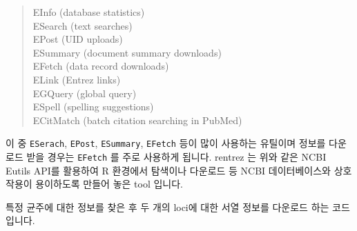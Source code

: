 \documentclass[
]{book}
\newenvironment{Shaded}{\begin{snugshade}}{\end{snugshade}}
\newcommand{\AttributeTok}[1]{\textcolor[rgb]{0.77,0.63,0.00}{#1}}
\newcommand{\FunctionTok}[1]{\textcolor[rgb]{0.00,0.00,0.00}{#1}}
\newcommand{\NormalTok}[1]{#1}
\newcommand{\OtherTok}[1]{\textcolor[rgb]{0.56,0.35,0.01}{#1}}
\newcommand{\SpecialCharTok}[1]{\textcolor[rgb]{0.00,0.00,0.00}{#1}}
\newcommand{\StringTok}[1]{\textcolor[rgb]{0.31,0.60,0.02}{#1}}
\begin{document}
\begin{quote}
EInfo (database statistics)\\
ESearch (text searches)\\
EPost (UID uploads)\\
ESummary (document summary downloads)\\
EFetch (data record downloads)\\
ELink (Entrez links)\\
EGQuery (global query)\\
ESpell (spelling suggestions)\\
ECitMatch (batch citation searching in PubMed)
\end{quote}

이 중 \texttt{ESerach}, \texttt{EPost}, \texttt{ESummary}, \texttt{EFetch} 등이 많이 사용하는 유틸이며 정보를 다운로드 받을 경우는 \texttt{EFetch} 를 주로 사용하게 됩니다. rentrez 는 위와 같은 NCBI Eutils API를 활용하여 R 환경에서 탐색이나 다운로드 등 NCBI 데이터베이스와 상호작용이 용이하도록 만들어 놓은 tool 입니다.

\begin{Shaded}
\end{Shaded}

특정 균주에 대한 정보를 찾은 후 두 개의 loci에 대한 서열 정보를 다운로드 하는 코드입니다.
\end{document}
